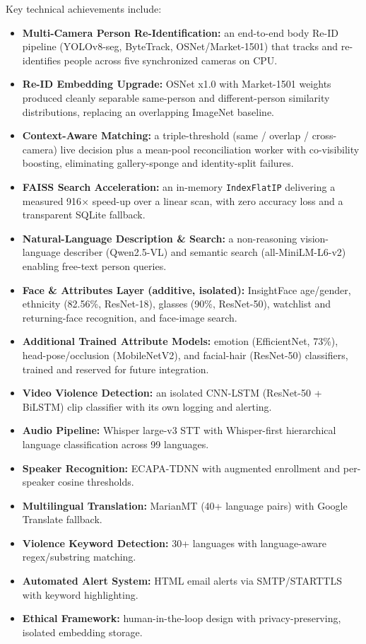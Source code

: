 \documentclass[12pt]{report}
\begin{document}
Key technical achievements include:
\begin{itemize}
    \item \textbf{Multi-Camera Person Re-Identification:} an end-to-end body Re-ID pipeline (YOLOv8-seg, ByteTrack, OSNet/Market-1501) that tracks and re-identifies people across five synchronized cameras on CPU.
    \item \textbf{Re-ID Embedding Upgrade:} OSNet x1.0 with Market-1501 weights produced cleanly separable same-person and different-person similarity distributions, replacing an overlapping ImageNet baseline.
    \item \textbf{Context-Aware Matching:} a triple-threshold (same / overlap / cross-camera) live decision plus a mean-pool reconciliation worker with co-visibility boosting, eliminating gallery-sponge and identity-split failures.
    \item \textbf{FAISS Search Acceleration:} an in-memory \texttt{IndexFlatIP} delivering a measured 916$\times$ speed-up over a linear scan, with zero accuracy loss and a transparent SQLite fallback.
    \item \textbf{Natural-Language Description \& Search:} a non-reasoning vision-language describer (Qwen2.5-VL) and semantic search (all-MiniLM-L6-v2) enabling free-text person queries.
    \item \textbf{Face \& Attributes Layer (additive, isolated):} InsightFace age/gender, ethnicity (82.56\%, ResNet-18), glasses (90\%, ResNet-50), watchlist and returning-face recognition, and face-image search.
    \item \textbf{Additional Trained Attribute Models:} emotion (EfficientNet, 73\%), head-pose/occlusion (MobileNetV2), and facial-hair (ResNet-50) classifiers, trained and reserved for future integration.
    \item \textbf{Video Violence Detection:} an isolated CNN-LSTM (ResNet-50 + BiLSTM) clip classifier with its own logging and alerting.
    \item \textbf{Audio Pipeline:} Whisper large-v3 STT with Whisper-first hierarchical language classification across 99 languages.
    \item \textbf{Speaker Recognition:} ECAPA-TDNN with augmented enrollment and per-speaker cosine thresholds.
    \item \textbf{Multilingual Translation:} MarianMT (40+ language pairs) with Google Translate fallback.
    \item \textbf{Violence Keyword Detection:} 30+ languages with language-aware regex/substring matching.
    \item \textbf{Automated Alert System:} HTML email alerts via SMTP/STARTTLS with keyword highlighting.
    \item \textbf{Ethical Framework:} human-in-the-loop design with privacy-preserving, isolated embedding storage.
\end{itemize}
\end{document}
